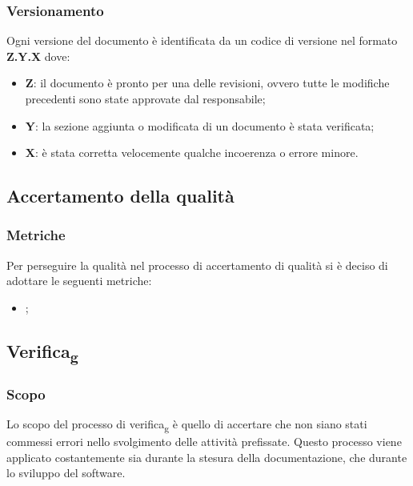         \subsubsection{Versionamento}
        Ogni versione del documento è identificata da un codice di versione nel formato \textbf{Z.Y.X} dove:
        \begin{itemize}
            \item \textbf{Z}: il documento è pronto per una delle revisioni, ovvero tutte le modifiche precedenti sono state approvate dal responsabile;
            \item \textbf{Y}: la sezione aggiunta o modificata di un documento è stata verificata;
            \item \textbf{X}: è stata corretta velocemente qualche incoerenza o errore minore.
        \end{itemize}

    \subsection{Accertamento della qualità}
        \subsubsection{Metriche}
        Per perseguire la qualità nel processo di accertamento di qualità si è deciso di adottare le seguenti metriche:
        \begin{itemize}
                \item {};
        \end{itemize}
    \subsection{Verifica\textsubscript{g}}
        \subsubsection{Scopo}
        Lo scopo del processo di verifica\textsubscript{g} è quello di accertare che non siano stati commessi errori nello svolgimento
        delle attività prefissate. Questo processo viene applicato costantemente sia durante la stesura
        della documentazione, che durante lo sviluppo del software.
